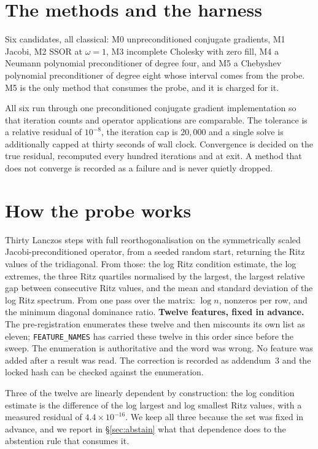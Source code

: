 \documentclass[11pt]{article}
\begin{document}
\section{The methods and the harness}

Six candidates, all classical: M0 unpreconditioned conjugate gradients, M1
Jacobi, M2 SSOR at $\omega=1$, M3 incomplete Cholesky with zero fill, M4 a
Neumann polynomial preconditioner of degree four, and M5 a Chebyshev polynomial
preconditioner of degree eight whose interval comes from the probe. M5 is the
only method that consumes the probe, and it is charged for it.

All six run through one preconditioned conjugate gradient implementation so that
iteration counts and operator applications are comparable. The tolerance is a
relative residual of $10^{-8}$, the iteration cap is $20{,}000$ and a single
solve is additionally capped at thirty seconds of wall clock. Convergence is
decided on the true residual, recomputed every hundred iterations and at exit. A
method that does not converge is recorded as a failure and is never quietly
dropped.

\section{How the probe works}

Thirty Lanczos steps with full reorthogonalisation on the symmetrically scaled
Jacobi-\hspace{0pt}preconditioned operator, from a seeded random start, returning the Ritz
values of the tridiagonal. From those: the log Ritz condition estimate, the log
extremes, the three Ritz quartiles normalised by the largest, the largest
relative gap between consecutive Ritz values, and the mean and standard deviation
of the log Ritz spectrum. From one pass over the matrix: $\log n$, nonzeros per
row, and the minimum diagonal dominance ratio. \textbf{Twelve features, fixed in
advance.} The pre-registration enumerates these twelve and then miscounts its
own list as eleven; \texttt{FEATURE\_NAMES} has carried these twelve in this order since
before the sweep. The enumeration is authoritative and the word was wrong. No feature
was added after a result was read. The correction is recorded as addendum~3 and the
locked hash can be checked against the enumeration.

Three of the twelve are linearly dependent by construction: the log condition estimate is the
difference of the log largest and log smallest Ritz values, with a measured residual of
$4.4\times10^{-16}$. We keep all three because the set was fixed in advance, and we report
in \S\ref{sec:abstain} what that dependence does to the abstention rule that consumes it.
\end{document}

